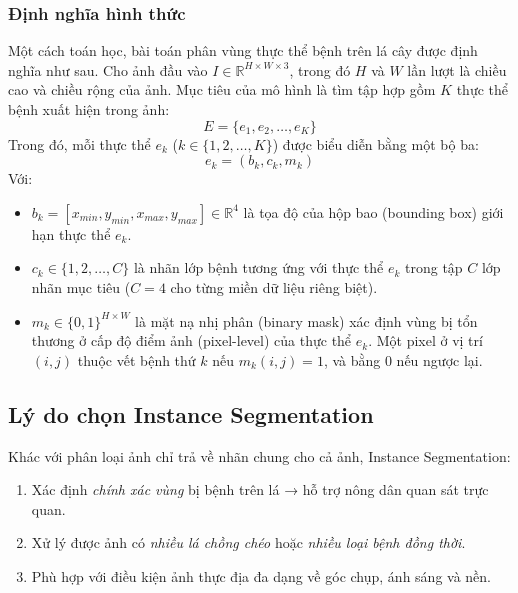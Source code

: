 \subsubsection{Định nghĩa hình thức}
Một cách toán học, bài toán phân vùng thực thể bệnh trên lá cây được định nghĩa như sau. Cho ảnh đầu vào $I \in \mathbb{R}^{H \times W \times 3}$, trong đó $H$ và $W$ lần lượt là chiều cao và chiều rộng của ảnh. Mục tiêu của mô hình là tìm tập hợp gồm $K$ thực thể bệnh xuất hiện trong ảnh:
\begin{equation}
    E = \{e_1, e_2, \dots, e_K\}
\end{equation}
Trong đó, mỗi thực thể $e_k$ ($k \in \{1, 2, \dots, K\}$) được biểu diễn bằng một bộ ba:
\begin{equation}
    e_k = (b_k, c_k, m_k)
\end{equation}
Với:
\begin{itemize}
    \item $b_k = [x_{min}, y_{min}, x_{max}, y_{max}] \in \mathbb{R}^4$ là tọa độ của hộp bao (bounding box) giới hạn thực thể $e_k$.
    \item $c_k \in \{1, 2, \dots, C\}$ là nhãn lớp bệnh tương ứng với thực thể $e_k$ trong tập $C$ lớp nhãn mục tiêu ($C = 4$ cho từng miền dữ liệu riêng biệt).
    \item $m_k \in \{0, 1\}^{H \times W}$ là mặt nạ nhị phân (binary mask) xác định vùng bị tổn thương ở cấp độ điểm ảnh (pixel-level) của thực thể $e_k$. Một pixel ở vị trí $(i, j)$ thuộc vết bệnh thứ $k$ nếu $m_k(i, j) = 1$, và bằng $0$ nếu ngược lại.
\end{itemize}

\subsection{Lý do chọn Instance Segmentation}

Khác với phân loại ảnh chỉ trả về nhãn chung cho cả ảnh, Instance Segmentation:
\begin{enumerate}
    \item Xác định \emph{chính xác vùng} bị bệnh trên lá → hỗ trợ nông dân quan sát trực quan.
    \item Xử lý được ảnh có \emph{nhiều lá chồng chéo} hoặc \emph{nhiều loại bệnh đồng thời}.
    \item Phù hợp với điều kiện ảnh thực địa đa dạng về góc chụp, ánh sáng và nền.
\end{enumerate}
